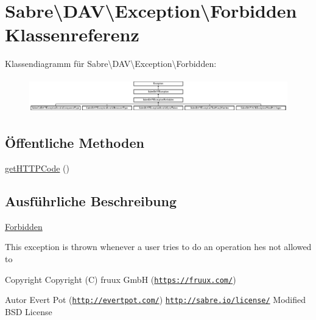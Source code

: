 \hypertarget{class_sabre_1_1_d_a_v_1_1_exception_1_1_forbidden}{}\section{Sabre\textbackslash{}D\+AV\textbackslash{}Exception\textbackslash{}Forbidden Klassenreferenz}
\label{class_sabre_1_1_d_a_v_1_1_exception_1_1_forbidden}
Klassendiagramm für Sabre\textbackslash{}D\+AV\textbackslash{}Exception\textbackslash{}Forbidden\+:\begin{figure}[H]
\begin{center}
\leavevmode
\includegraphics[height=1.518644cm]{class_sabre_1_1_d_a_v_1_1_exception_1_1_forbidden}
\end{center}
\end{figure}
\subsection*{Öffentliche Methoden}
\begin{DoxyCompactItemize}
\item 
\mbox{\hyperlink{class_sabre_1_1_d_a_v_1_1_exception_1_1_forbidden_a27075928ac99f75d1db0a95001eceb91}{get\+H\+T\+T\+P\+Code}} ()
\end{DoxyCompactItemize}


\subsection{Ausführliche Beschreibung}
\mbox{\hyperlink{class_sabre_1_1_d_a_v_1_1_exception_1_1_forbidden}{Forbidden}}

This exception is thrown whenever a user tries to do an operation he\textquotesingle{}s not allowed to

\begin{DoxyCopyright}{Copyright}
Copyright (C) fruux GmbH (\href{https://fruux.com/}{\tt https\+://fruux.\+com/}) 
\end{DoxyCopyright}
\begin{DoxyAuthor}{Autor}
Evert Pot (\href{http://evertpot.com/}{\tt http\+://evertpot.\+com/})  \href{http://sabre.io/license/}{\tt http\+://sabre.\+io/license/} Modified B\+SD License 
\end{DoxyAuthor}


